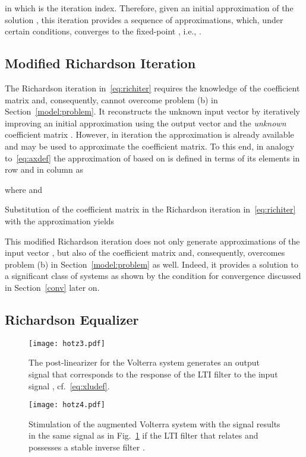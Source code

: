 \documentclass[10pt,twocolumn,twoside]{IEEEtran}
\begin{document}
in which  is the iteration index.
Therefore, given an initial approximation  of the solution , this iteration
provides a sequence of approximations, which, under certain conditions, converges to the
fixed-point , i.e., .

\subsection{Modified Richardson Iteration}

The Richardson iteration in~\eqref{eq:richiter} requires the knowledge of the
coefficient matrix  and, consequently, cannot overcome problem
(b) in Section~\ref{model:problem}. It reconstructs the unknown input vector
 by iteratively improving an initial approximation  using the
output vector  and the \emph{unknown} coefficient matrix .
However, in iteration  the approximation  is already available and may
be used to approximate the coefficient matrix. To this end, in analogy to~\eqref{eq:axdef} the approximation
 of  based on  is defined in
terms of its elements  in row  and in column  as

where  and

Substitution of the coefficient matrix  in the Richardson iteration
in~\eqref{eq:richiter} with the approximation  yields

This modified Richardson iteration does not only generate approximations of the input vector , but
also of the coefficient matrix  and, consequently, overcomes problem (b)
in Section~\ref{model:problem} as well. Indeed, it provides a solution to a
significant class of systems as shown by the condition for convergence discussed
in Section~\ref{conv} later on.

\subsection{Richardson Equalizer}
	\label{mlim:richeq}

\begin{figure}[!t]
	\centering
	\texttt{[image: hotz3.pdf]}
	\caption{The post-linearizer for the Volterra system 
		generates an output signal  that corresponds to the response of the
		LTI filter  to the input signal , cf.~\eqref{eq:xludef}.}
	\label{fig:hnpostlin:a}
\end{figure}
\begin{figure}[!t]
	\centering
	\texttt{[image: hotz4.pdf]}
	\caption{Stimulation of the augmented Volterra system  with the signal 
		results in the same signal  as in Fig.~\ref{fig:hnpostlin:a} if the LTI
		filter  that relates  and  possesses a stable inverse filter .}
	\label{fig:postlinaltsys}
\end{figure}
\end{document}
